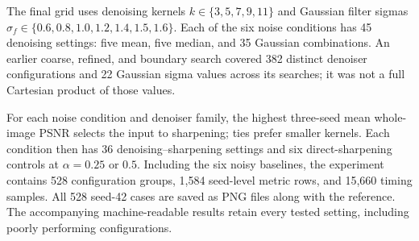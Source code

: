 \documentclass[a4paper,12pt]{article}
\begin{document}
The final grid uses denoising kernels $k\in\{3,5,7,9,11\}$ and Gaussian filter sigmas $\sigma_f\in\{0.6,0.8,1.0,1.2,1.4,1.5,1.6\}$. Each of the six noise conditions has 45 denoising settings: five mean, five median, and 35 Gaussian combinations. An earlier coarse, refined, and boundary search covered 382 distinct denoiser configurations and 22 Gaussian sigma values across its searches; it was not a full Cartesian product of those values.

For each noise condition and denoiser family, the highest three-seed mean whole-image PSNR selects the input to sharpening; ties prefer smaller kernels. Each condition then has 36 denoising--sharpening settings and six direct-sharpening controls at $\alpha=0.25$ or $0.5$. Including the six noisy baselines, the experiment contains 528 configuration groups, 1,584 seed-level metric rows, and 15,660 timing samples. All 528 seed-42 cases are saved as PNG files along with the reference. The accompanying machine-readable results retain every tested setting, including poorly performing configurations.
\end{document}
